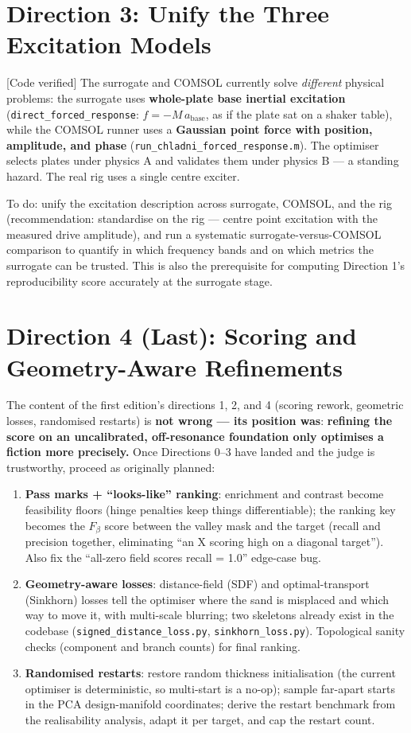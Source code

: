 \documentclass[11pt,a4paper]{article}
\newcommand{\code}[1]{\texttt{#1}}
\begin{document}
\section{Direction 3: Unify the Three Excitation Models}

{[Code verified]} The surrogate and COMSOL currently solve \emph{different} physical problems: the surrogate uses \textbf{whole-plate base inertial excitation} (\code{direct\_forced\_response}: $f=-M\,a_{\mathrm{base}}$, as if the plate sat on a shaker table), while the COMSOL runner uses a \textbf{Gaussian point force with position, amplitude, and phase} (\code{run\_chladni\_forced\_response.m}). The optimiser selects plates under physics A and validates them under physics B --- a standing hazard. The real rig uses a single centre exciter.

To do: unify the excitation description across surrogate, COMSOL, and the rig (recommendation: standardise on the rig --- centre point excitation with the measured drive amplitude), and run a systematic surrogate-versus-COMSOL comparison to quantify in which frequency bands and on which metrics the surrogate can be trusted. This is also the prerequisite for computing Direction 1's reproducibility score accurately at the surrogate stage.

\section{Direction 4 (Last): Scoring and Geometry-Aware Refinements}

The content of the first edition's directions 1, 2, and 4 (scoring rework, geometric losses, randomised restarts) is \textbf{not wrong --- its position was}: \textbf{refining the score on an uncalibrated, off-resonance foundation only optimises a fiction more precisely.} Once Directions 0--3 have landed and the judge is trustworthy, proceed as originally planned:

\begin{enumerate}[leftmargin=2em]
\item \textbf{Pass marks + ``looks-like'' ranking}: enrichment and contrast become feasibility floors (hinge penalties keep things differentiable); the ranking key becomes the $F_\beta$ score between the valley mask and the target (recall and precision together, eliminating ``an X scoring high on a diagonal target''). Also fix the ``all-zero field scores recall = 1.0'' edge-case bug.
\item \textbf{Geometry-aware losses}: distance-field (SDF) and optimal-transport (Sinkhorn) losses tell the optimiser where the sand is misplaced and which way to move it, with multi-scale blurring; two skeletons already exist in the codebase (\code{signed\_distance\_loss.py}, \code{sinkhorn\_loss.py}). Topological sanity checks (component and branch counts) for final ranking.
\item \textbf{Randomised restarts}: restore random thickness initialisation (the current optimiser is deterministic, so multi-start is a no-op); sample far-apart starts in the PCA design-manifold coordinates; derive the restart benchmark from the realisability analysis, adapt it per target, and cap the restart count.
\end{enumerate}
\end{document}
